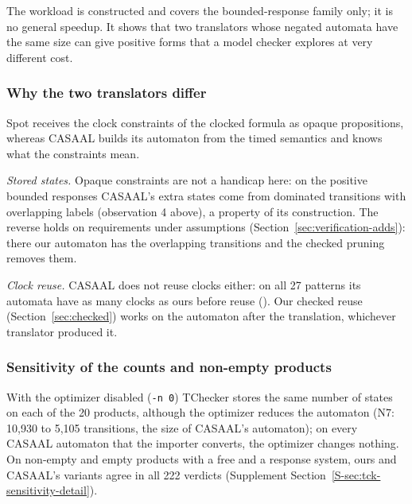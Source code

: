 The workload is constructed and covers the bounded-response family only; it is no general speedup. It shows that two translators whose negated automata have the same size can give positive forms that a model checker explores at very different cost.  

\subsubsection{Why the two translators differ}
\label{sec:casaal-why}
Spot receives the clock constraints of the clocked formula as opaque propositions, whereas CASAAL builds its automaton from the timed semantics and knows what the constraints mean. 



\emph{Stored states.} Opaque constraints are not a handicap here: on the positive bounded responses CASAAL's extra states come from dominated transitions with overlapping labels (observation 4 above), a property of its construction. The reverse holds on requirements under assumptions (Section~\ref{sec:verification-adds}): there our automaton has the overlapping transitions and the checked pruning removes them.

\emph{Clock reuse.} CASAAL does not reuse clocks either: on all 27 patterns its automata have as many clocks as ours before reuse (). Our checked reuse (Section~\ref{sec:checked}) works on the automaton after the translation, whichever translator produced it.

\subsubsection{Sensitivity of the counts and non-empty products}
\label{sec:tck-sensitivity}
With the optimizer disabled (\texttt{-n 0}) TChecker stores the same number of states on each of the 20 products, although the optimizer reduces the automaton (N7: 10{,}930 to 5{,}105 transitions, the size of CASAAL's automaton); on every CASAAL automaton that the importer converts, the optimizer changes nothing.  On non-empty and empty products with a free and a response system, ours and CASAAL's variants agree in all 222 verdicts (Supplement Section~\ref{S-sec:tck-sensitivity-detail}).
